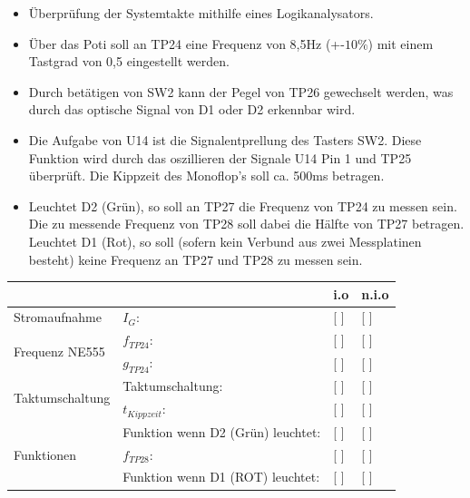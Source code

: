 \documentclass[a4paper,11pt]{scrartcl}
\begin{document}
\begin{itemize}
	\item{Überprüfung der Systemtakte mithilfe eines Logikanalysators.}
	
	 \item{Über das Poti soll an TP24 eine Frequenz von 8,5Hz (+-$10\%$) mit einem Tastgrad von 0,5 eingestellt werden.}
	 
	 \item{Durch betätigen von SW2 kann der Pegel von TP26 gewechselt werden, was durch das optische Signal von D1 oder D2 erkennbar wird.}
	 
	 \item{Die Aufgabe von U14 ist die Signalentprellung des Tasters SW2. Diese Funktion wird durch das oszillieren der Signale U14 Pin 1 und TP25 überprüft. Die Kippzeit des Monoflop's soll ca. 500ms betragen.}
	 
	 \item{Leuchtet D2 (Grün), so soll an TP27 die Frequenz von TP24 zu messen sein. Die zu messende Frequenz von TP28 soll dabei die Hälfte von TP27 betragen. Leuchtet D1 (Rot), so soll (sofern kein Verbund aus zwei Messplatinen besteht) keine Frequenz an TP27 und TP28 zu messen sein.}	 
\end{itemize}


\renewcommand{\arraystretch}{2}
\begin{tabularx}{\textwidth}{p{}| p{} | p{} | p{}}

 &  & i.o & n.i.o \\

\hline

Stromaufnahme & $I_{G}$: & [ ] & [ ] \\

\hline

\multirow{2}{*}{Frequenz NE555 }
		& $f_{TP24}$: 				& [ ] & [ ] \\
		& $g_{TP24}$:				& [ ] & [ ] \\

\hline

\multirow{2}{*}{Taktumschaltung}
		& Taktumschaltung:				&	[ ] & [ ] 	\\
		& $t_{Kippzeit}$: 				&	[ ]	& [ ] 	\\
	
\hline		
		
\multirow{3}{*}{Funktionen}
		& Funktion wenn D2 (Grün) leuchtet:  			& [ ] & [ ] 	\\
		& $f_{TP28}$: 									& [ ] & [ ] 	\\
		& Funktion wenn D1 (ROT) leuchtet:				& [ ] & [ ] 	\\ 

\end{tabularx}
\renewcommand{\arraystretch}{1}
\end{document}
